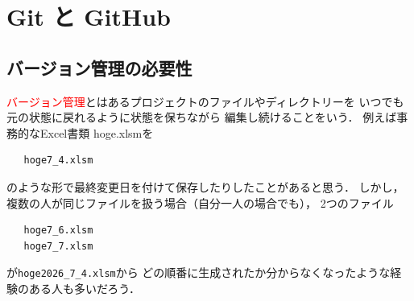 %
%
%
%
%
%
%      
%

\chapter{Git と GitHub}

\section{バージョン管理の必要性}
\textcolor{red}{バージョン管理}とはあるプロジェクトのファイルやディレクトリーを
いつでも元の状態に戻れるように状態を保ちながら
編集し続けることをいう．
例えば事務的なExcel書類 hoge.xlsmを

\begin{verbatim}
   hoge7_4.xlsm
\end{verbatim}

\noindent
のような形で最終変更日を付けて保存したりしたことがあると思う．
しかし，複数の人が同じファイルを扱う場合（自分一人の場合でも），
2つのファイル
\begin{verbatim}
   hoge7_6.xlsm
   hoge7_7.xlsm
\end{verbatim}
が\verb/hoge2026_7_4.xlsm/から
どの順番に生成されたか分からなくなったような経験のある人も多いだろう．

